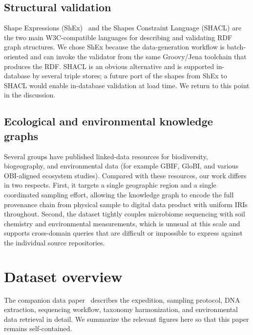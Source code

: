 \documentclass[11pt,a4paper]{article}
\begin{document}
\subsection{Structural validation}

Shape Expressions (ShEx)~\cite{shex} and the Shapes Constraint
Language (SHACL) are the two main W3C-compatible languages for
describing and validating RDF graph structures. We chose ShEx because
the data-generation workflow is batch-oriented and can invoke the
validator from the same Groovy/Jena toolchain that produces the
RDF. SHACL is an obvious alternative and is supported in-database by
several triple stores; a future port of the shapes from ShEx to
SHACL would enable in-database validation at load time. We return
to this point in the discussion.

\subsection{Ecological and environmental knowledge graphs}

Several groups have published linked-data resources for biodiversity,
biogeography, and environmental data (for example GBIF, GloBI, and
various OBI-aligned ecosystem studies). Compared with these
resources, our work differs in two respects. First, it targets a
single geographic region and a single coordinated sampling effort,
allowing the knowledge graph to encode the full provenance chain
from physical sample to digital data product with uniform IRIs
throughout. Second, the dataset tightly couples microbiome sequencing
with soil chemistry and environmental measurements, which is unusual
at this scale and supports cross-domain queries that are difficult
or impossible to express against the individual source
repositories.

\section{Dataset overview}

The companion data paper~\cite{gigascience_companion} describes the
expedition, sampling protocol, DNA extraction, sequencing workflow,
taxonomy harmonization, and environmental data retrieval in detail.
We summarize the relevant figures here so that this paper remains
self-contained.
\end{document}
